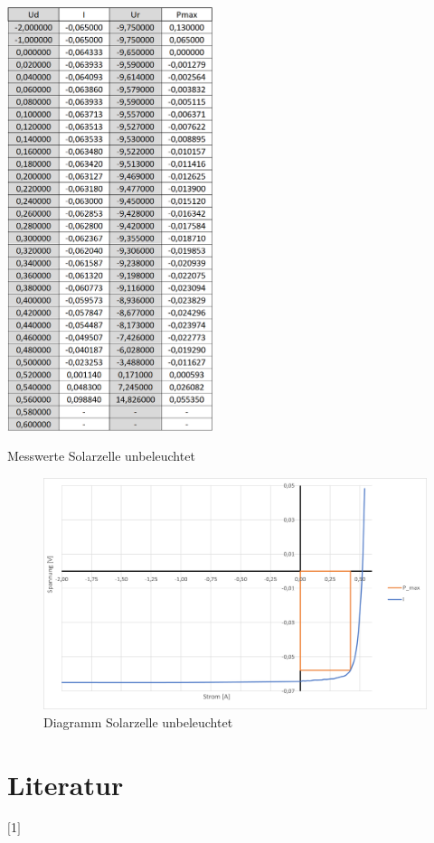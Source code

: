 \documentclass[a4paper]{scrartcl}
\numberwithin{equation}{subsection}
\begin{document}
\begin{table}[H]
\includegraphics[width=6cm]{Tabelle_beleuchtet}
\centering
\caption{Messwerte Solarzelle unbeleuchtet}
\label{tab:beleuchtet}
\end{table}

\begin{figure}[H]
\includegraphics[width=14cm]{Diagramm_beleuchtet}
\centering
\caption{Diagramm Solarzelle unbeleuchtet}
\centering
\label{fig:beleuchtet}
\end{figure}

\newpage
\section{Literatur}
$[$1$]$ 


\label{LastPage}
\end{document}
